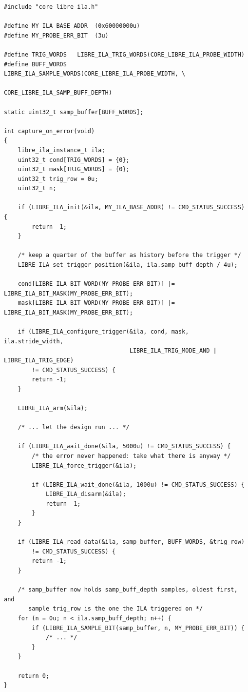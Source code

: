 \documentclass[../manual.tex]{subfiles}
\begin{document}
\begin{lstlisting}
#include "core_libre_ila.h"

#define MY_ILA_BASE_ADDR  (0x60000000u)
#define MY_PROBE_ERR_BIT  (3u)

#define TRIG_WORDS   LIBRE_ILA_TRIG_WORDS(CORE_LIBRE_ILA_PROBE_WIDTH)
#define BUFF_WORDS   LIBRE_ILA_SAMPLE_WORDS(CORE_LIBRE_ILA_PROBE_WIDTH, \
                                            CORE_LIBRE_ILA_SAMP_BUFF_DEPTH)

static uint32_t samp_buffer[BUFF_WORDS];

int capture_on_error(void)
{
    libre_ila_instance_t ila;
    uint32_t cond[TRIG_WORDS] = {0};
    uint32_t mask[TRIG_WORDS] = {0};
    uint32_t trig_row = 0u;
    uint32_t n;

    if (LIBRE_ILA_init(&ila, MY_ILA_BASE_ADDR) != CMD_STATUS_SUCCESS) {
        return -1;
    }

    /* keep a quarter of the buffer as history before the trigger */
    LIBRE_ILA_set_trigger_position(&ila, ila.samp_buff_depth / 4u);

    cond[LIBRE_ILA_BIT_WORD(MY_PROBE_ERR_BIT)] |= LIBRE_ILA_BIT_MASK(MY_PROBE_ERR_BIT);
    mask[LIBRE_ILA_BIT_WORD(MY_PROBE_ERR_BIT)] |= LIBRE_ILA_BIT_MASK(MY_PROBE_ERR_BIT);

    if (LIBRE_ILA_configure_trigger(&ila, cond, mask, ila.stride_width,
                                    LIBRE_ILA_TRIG_MODE_AND | LIBRE_ILA_TRIG_EDGE)
        != CMD_STATUS_SUCCESS) {
        return -1;
    }

    LIBRE_ILA_arm(&ila);

    /* ... let the design run ... */

    if (LIBRE_ILA_wait_done(&ila, 5000u) != CMD_STATUS_SUCCESS) {
        /* the error never happened: take what there is anyway */
        LIBRE_ILA_force_trigger(&ila);

        if (LIBRE_ILA_wait_done(&ila, 1000u) != CMD_STATUS_SUCCESS) {
            LIBRE_ILA_disarm(&ila);
            return -1;
        }
    }

    if (LIBRE_ILA_read_data(&ila, samp_buffer, BUFF_WORDS, &trig_row)
        != CMD_STATUS_SUCCESS) {
        return -1;
    }

    /* samp_buffer now holds samp_buff_depth samples, oldest first, and
       sample trig_row is the one the ILA triggered on */
    for (n = 0u; n < ila.samp_buff_depth; n++) {
        if (LIBRE_ILA_SAMPLE_BIT(samp_buffer, n, MY_PROBE_ERR_BIT)) {
            /* ... */
        }
    }

    return 0;
}
\end{lstlisting}
\end{document}
